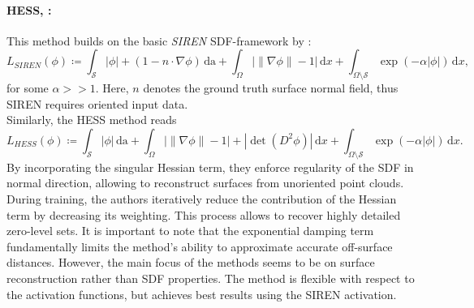 \documentclass[12pt,openany]{book}
\def\S{\mathcal{S}}
\theoremstyle{plainnormal}
\theoremstyle{remark}
\begin{document}
\paragraph{HESS, \cite{wang2023neuralsingularhessianimplicitneuralrepresentation}:} This method builds on the basic \emph{SIREN} SDF-framework by \cite{sitzmann2020implicitneuralrepresentationsperiodic}:
$$
L_{SIREN}(\phi) \coloneqq \int_\S |\phi| + (1-n\cdot\nabla \phi) \,\mathrm{da} + \int_\Omega \big|\|\nabla \phi\| - 1\big| \,\mathrm{d}x + \int_{\Omega\setminus\S} \exp(-\alpha |\phi|) \,\mathrm{d}x,
$$
for some $\alpha >> 1$. Here, $n$ denotes the ground truth surface normal field, thus SIREN requires oriented input data.\\
Similarly, the HESS method reads
$$L_{HESS}(\phi) \coloneqq \int_\S |\phi| \,\mathrm{da} + \int_\Omega \big|\|\nabla \phi\| - 1\big|  + |\det(D^2\phi)| \,\mathrm{d}x + \int_{\Omega\setminus\S} \exp(-\alpha |\phi|) \,\mathrm{d}x. $$
By incorporating the singular Hessian term, they enforce regularity of the SDF in normal direction, allowing to reconstruct surfaces from unoriented point clouds. \\
During training, the authors iteratively reduce the contribution of the Hessian term by decreasing its weighting. This process allows to recover highly detailed zero-level sets. It is important to note that the exponential damping term fundamentally limits the method’s ability to approximate accurate off-surface distances. However, the main focus of the methods seems to be on surface reconstruction rather than SDF properties. The method is flexible with respect to the activation functions, but achieves best results using the SIREN activation. 
\end{document}
